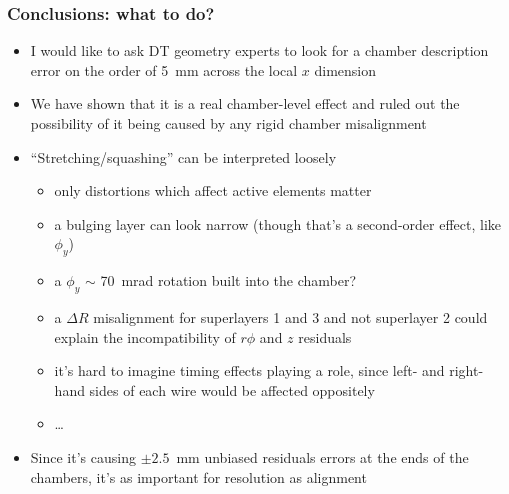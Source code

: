 \documentclass[compress]{beamer}
\begin{document}

\begin{frame}
\frametitle{Conclusions: what to do?}
\begin{itemize}\setlength{\itemsep}{0.2 cm}
\item I would like to ask DT geometry experts to look for a chamber
  description error on the order of 5~mm across the local $x$
  dimension

\item We have shown that it is a real chamber-level effect and ruled
  out the possibility of it being caused by any rigid chamber misalignment

\item ``Stretching/squashing'' can be interpreted loosely
\begin{itemize}
\item only distortions which affect active elements matter
\item a bulging layer can look narrow (though that's a second-order effect, like $\phi_y$)
\item a $\phi_y$ $\sim$ 70~mrad rotation built into the chamber?
\item a $\Delta R$ misalignment for superlayers 1 and 3 and not superlayer 2 could explain the incompatibility of $r\phi$ and $z$ residuals
\item it's hard to imagine timing effects playing a role, since left- and right-hand sides of each wire would be affected oppositely
\item \ldots
\end{itemize}

\item Since it's causing $\pm 2.5$~mm unbiased residuals errors at the ends of
  the chambers, it's as important for resolution as alignment

\end{itemize}
\label{numpages}
\end{frame}
\end{document}

